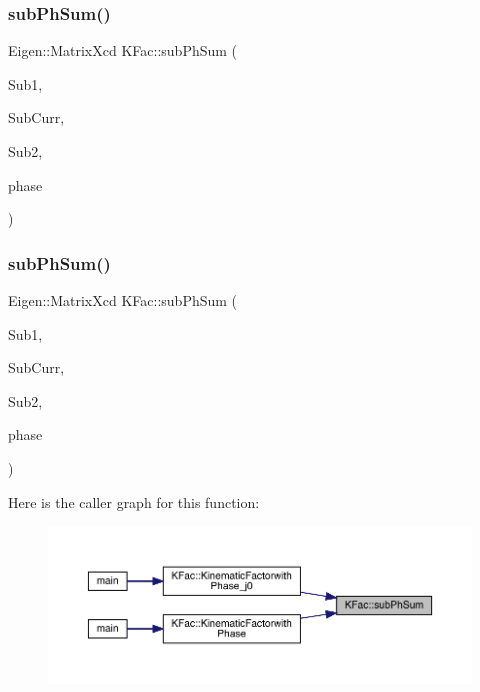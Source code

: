 \subsubsection{\texorpdfstring{subPhSum()}{subPhSum()}\hspace{0.1cm}{\footnotesize\ttfamily [1/2]}}
{\footnotesize\ttfamily Eigen\+::\+Matrix\+Xcd K\+Fac\+::sub\+Ph\+Sum (\begin{DoxyParamCaption}\item[{map$<$ int, Eigen\+::\+Matrix\+Xcd $>$ \&}]{Sub1,  }\item[{Eigen\+::\+Matrix\+Xcd \&}]{Sub\+Curr,  }\item[{map$<$ int, Eigen\+::\+Matrix\+Xcd $>$ \&}]{Sub2,  }\item[{\mbox{\hyperlink{structPh_1_1phChars}{Ph\+::ph\+Chars}} \&}]{phase }\end{DoxyParamCaption})}

\mbox{\label{namespaceKFac_ac23a25c1e9762e3c46e69835193075df}} 
\subsubsection{\texorpdfstring{subPhSum()}{subPhSum()}\hspace{0.1cm}{\footnotesize\ttfamily [2/2]}}
{\footnotesize\ttfamily Eigen\+::\+Matrix\+Xcd K\+Fac\+::sub\+Ph\+Sum (\begin{DoxyParamCaption}\item[{map$<$ int, Eigen\+::\+Matrix\+Xcd $>$ \&}]{Sub1,  }\item[{map$<$ int, Eigen\+::\+Matrix\+Xcd $>$ \&}]{Sub\+Curr,  }\item[{map$<$ int, Eigen\+::\+Matrix\+Xcd $>$ \&}]{Sub2,  }\item[{\mbox{\hyperlink{structPh_1_1phChars}{Ph\+::ph\+Chars}} \&}]{phase }\end{DoxyParamCaption})}

Here is the caller graph for this function\+:\nopagebreak
\begin{figure}[H]
\begin{center}
\leavevmode
\includegraphics[width=350pt]{d2/d89/namespaceKFac_ac23a25c1e9762e3c46e69835193075df_icgraph}
\end{center}
\end{figure}
\mbox{\label{namespaceKFac_abb86856b8424632f8f879408ce2cc05b}} 
